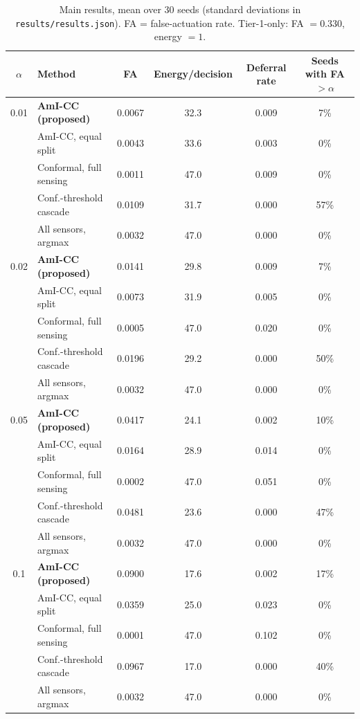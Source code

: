 \documentclass[10pt,a4paper]{article}
\begin{document}
\begin{table}[H]\centering\small
\caption{Main results, mean over 30 seeds (standard deviations in \texttt{results/results.json}). FA = false-actuation rate. Tier-1-only: FA $=0.330$, energy $=1$.}
\begin{tabular}{@{}c l c c c c@{}}
\toprule
$\alpha$ & Method & FA & Energy/decision & Deferral rate & Seeds with FA$>\alpha$\\ \midrule
0.01 & \textbf{AmI-CC (proposed)} & 0.0067 & 32.3 & 0.009 & 7\% \\
 & AmI-CC, equal split & 0.0043 & 33.6 & 0.003 & 0\% \\
 & Conformal, full sensing & 0.0011 & 47.0 & 0.009 & 0\% \\
 & Conf.-threshold cascade & 0.0109 & 31.7 & 0.000 & 57\% \\
 & All sensors, argmax & 0.0032 & 47.0 & 0.000 & 0\% \\
\midrule
0.02 & \textbf{AmI-CC (proposed)} & 0.0141 & 29.8 & 0.009 & 7\% \\
 & AmI-CC, equal split & 0.0073 & 31.9 & 0.005 & 0\% \\
 & Conformal, full sensing & 0.0005 & 47.0 & 0.020 & 0\% \\
 & Conf.-threshold cascade & 0.0196 & 29.2 & 0.000 & 50\% \\
 & All sensors, argmax & 0.0032 & 47.0 & 0.000 & 0\% \\
\midrule
0.05 & \textbf{AmI-CC (proposed)} & 0.0417 & 24.1 & 0.002 & 10\% \\
 & AmI-CC, equal split & 0.0164 & 28.9 & 0.014 & 0\% \\
 & Conformal, full sensing & 0.0002 & 47.0 & 0.051 & 0\% \\
 & Conf.-threshold cascade & 0.0481 & 23.6 & 0.000 & 47\% \\
 & All sensors, argmax & 0.0032 & 47.0 & 0.000 & 0\% \\
\midrule
0.1 & \textbf{AmI-CC (proposed)} & 0.0900 & 17.6 & 0.002 & 17\% \\
 & AmI-CC, equal split & 0.0359 & 25.0 & 0.023 & 0\% \\
 & Conformal, full sensing & 0.0001 & 47.0 & 0.102 & 0\% \\
 & Conf.-threshold cascade & 0.0967 & 17.0 & 0.000 & 40\% \\
 & All sensors, argmax & 0.0032 & 47.0 & 0.000 & 0\% \\
\bottomrule
\end{tabular}
\end{table}
\end{document}
